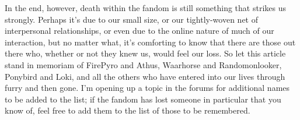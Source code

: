 In the end, however, death within the fandom is still something that strikes us strongly. Perhaps it's due to our small size, or our tightly-woven net of interpersonal relationships, or even due to the online nature of much of our interaction, but no matter what, it's comforting to know that there are those out there who, whether or not they knew us, would feel our loss. So let this article stand in memoriam of FirePyro and Athus, Waarhorse and Randomonlooker, Ponybird and Loki, and all the others who have entered into our lives through furry and then gone. I'm opening up a topic in the forums for additional names to be added to the list; if the fandom has lost someone in particular that you know of, feel free to add them to the list of those to be remembered.
